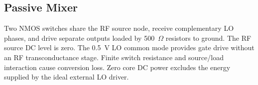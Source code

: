 \subsection{Passive Mixer}
Two NMOS switches share the RF source node, receive complementary LO phases,
and drive separate outputs loaded by 500~$\Omega$ resistors to ground.
The RF source DC level is zero. The 0.5~V LO common mode provides gate drive
without an RF transconductance stage. Finite switch resistance and source/load
interaction cause conversion loss. Zero core DC power excludes the energy
supplied by the ideal external LO driver.

